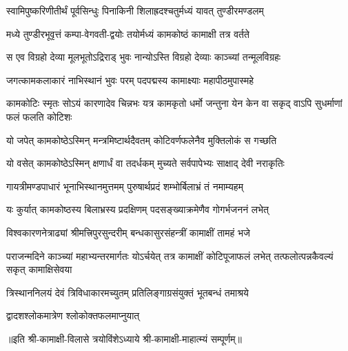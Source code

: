 

\twolineshloka
{स्वामिपुष्करिणीतीर्थं पूर्वसिन्धुः पिनाकिनी}
{शिलाह्रदश्चतुर्मध्यं यावत् तुण्डीरमण्डलम्}

\twolineshloka
{मध्ये तुण्डीरभूवृत्तं कम्पा-वेगवती-द्वयोः}
{तयोर्मध्यं कामकोष्ठं कामाक्षी तत्र वर्तते}

\twolineshloka
{स एव विग्रहो देव्या मूलभूतोऽद्रिराड् भुवः}
{नान्योऽस्ति विग्रहो देव्याः काञ्च्यां तन्मूलविग्रहः}

\twolineshloka
{जगत्कामकलाकारं नाभिस्थानं भुवः परम्}
{पदपद्मस्य कामाक्ष्याः महापीठमुपास्महे}

\threelineshloka
{कामकोटिः स्मृतः सोऽयं कारणादेव चिन्नभः}
{यत्र कामकृतो धर्मो जन्तुना येन केन वा}
{सकृद् वाऽपि सुधर्माणां फलं फलति कोटिशः}

\twolineshloka
{यो जपेत् कामकोष्ठेऽस्मिन् मन्त्रमिष्टार्थदैवतम्}
{कोटिवर्णफलेनैव मुक्तिलोकं स गच्छति}

\twolineshloka
{यो वसेत् कामकोष्ठेऽस्मिन् क्षणार्धं वा तदर्धकम्}
{मुच्यते सर्वपापेभ्यः साक्षाद् देवी नराकृतिः}

\twolineshloka
{गायत्रीमण्डपाधारं भूनाभिस्थानमुत्तमम्}
{पुरुषार्थप्रदं शम्भोर्बिलाभ्रं तं नमाम्यहम्}

\twolineshloka
{यः कुर्यात् कामकोष्ठस्य बिलाभ्रस्य प्रदक्षिणम्}
{पदसङ्ख्याक्रमेणैव गोगर्भजननं लभेत्}

\twolineshloka
{विश्वकारणनेत्राढ्यां श्रीमत्त्रिपुरसुन्दरीम्}
{बन्धकासुरसंहन्त्रीं कामाक्षीं तामहं भजे}

\threelineshloka
{पराजन्मदिने काञ्च्यां महाभ्यन्तरमार्गतः}
{योऽर्चयेत् तत्र कामाक्षीं कोटिपूजाफलं लभेत्}
{तत्फलोत्पन्नकैवल्यं सकृत् कामाक्षिसेवया}

\twolineshloka
{त्रिस्थाननिलयं देवं त्रिविधाकारमच्युतम्}
{प्रतिलिङ्गाग्रसंयुक्तं भूतबन्धं तमाश्रये}

{द्वादशश्लोकमात्रेण श्लोकोक्तफलमाप्नुयात्}

॥इति श्री-कामाक्षी-विलासे त्रयोविंशेऽध्याये श्री-कामाक्षी-माहात्म्यं सम्पूर्णम्॥